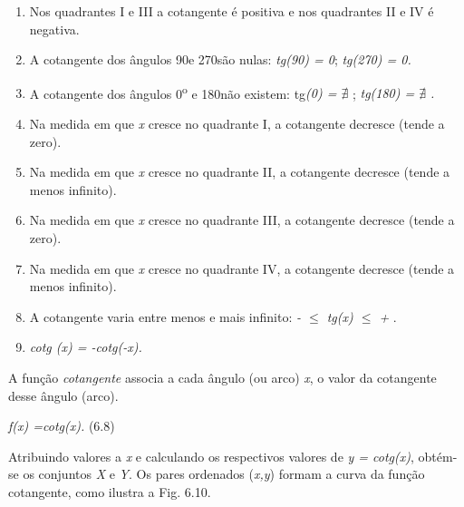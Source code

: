 \begin{caixa}
\begin{enumerate}
    \item Nos quadrantes I e III a cotangente é positiva e nos quadrantes II e IV é negativa.

    \item A cotangente dos ângulos 90\degree e 270\degree  são nulas:\textit{ tg(90\degree) = 0};  \textit{tg(270\degree) = 0.}

    \item A cotangente dos ângulos 0\textsuperscript{o} e 180\degree não existem: tg\textit{(0\degree) =  \(  \nexists  \) };  \textit{tg(180\degree) =  \(  \nexists  \) .}

    \item Na medida em que \textit{x} cresce no quadrante I, a cotangente decresce (tende a zero).

    \item Na medida em que \textit{x} cresce no quadrante II, a cotangente decresce (tende a menos infinito).

    \item Na medida em que \textit{x} cresce no quadrante III, a cotangente decresce (tende a zero).

    \item Na medida em que \textit{x} cresce no quadrante IV, a cotangente decresce (tende a menos infinito).

    \item A cotangente varia entre menos e mais infinito:   \textit{-  $ \leq $  tg(x) $ \leq $  + }.

    \item \textit{cotg (x) = -cotg(-x).}
\end{enumerate}
\end{caixa}

\begin{caixa}
A função \textit{cotangente} associa a cada ângulo (ou arco) \textit{x}, o valor da cotangente desse ângulo (arco).

\textit{f(x) =cotg(x).} \tab (6.8)
\end{caixa}

Atribuindo valores a \textit{x} e calculando os respectivos valores de \textit{y = cotg(x)}, obtém-se os conjuntos \textit{X }e\textit{ Y}. Os pares ordenados (\textit{x,y}) formam a curva da função cotangente, como ilustra a Fig. 6.10.

